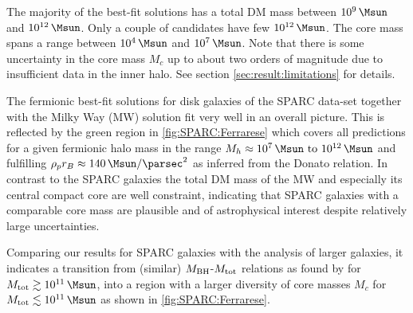 The majority of the best-fit solutions has a total DM mass between $\SI{E9}{\Msun}$ and $\SI{E12}{\Msun}$. Only a couple of  candidates have few $\SI{E12}{\Msun}$. The core mass spans a range between $\SI{E4}{\Msun}$ and $\SI{E7}{\Msun}$. Note that there is some uncertainty in the core mass $M_c$ up to about two orders of magnitude due to insufficient data in the inner halo. See section \ref{sec:result:limitations} for details.

The fermionic best-fit solutions for disk galaxies of the SPARC data-set together with the Milky Way (MW) solution \citep{2018PDU....21...82A} fit very well in an overall picture. This is reflected by the green region in \cref{fig:SPARC:Ferrarese} which covers all predictions for a given fermionic halo mass in the range $M_h \approx \SIrange{E7}{E12}{\Msun}$ and fulfilling $\rho_p r_B \approx \SI{140}{\Msun\per\parsec^2}$ as inferred from the Donato relation. In contrast to the SPARC galaxies the total DM mass of the MW and especially its central compact core are well constraint, indicating that SPARC galaxies with a comparable core mass are plausible and of astrophysical interest despite relatively large uncertainties.

Comparing our results for SPARC galaxies with the analysis of larger galaxies, it indicates a transition from (similar) $M_{\rm BH}$-$M_{\rm tot}$ relations as found by \citet{2002ApJ...578...90F,2015ApJ...800..124B} for $M_{\rm tot} \gtrsim \SI{E11}{\Msun}$, into a region with a larger diversity of core masses $M_c$ for $M_{\rm tot} \lesssim \SI{E11}{\Msun}$ as shown in \cref{fig:SPARC:Ferrarese}. 

